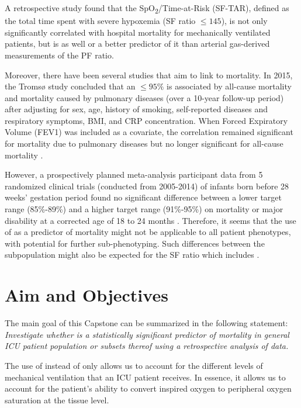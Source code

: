 A retrospective study found that the SpO\textsubscript{2}/\Fi Time-at-Risk (SF-TAR), defined as the total time spent with severe hypoxemia (SF ratio $\leq 145$), is not only significantly correlated with hospital mortality for mechanically ventilated patients, but is as well or a better predictor of it than arterial gas-derived measurements of the PF ratio. 

Moreover, there have been several studies that aim to link \Sp to mortality. In 2015, the Tromsø study concluded that an \Sp $\leq95\%$ is associated by all-cause mortality and mortality caused by pulmonary diseases (over a 10-year follow-up period) after adjusting for sex, age, history of smoking, self-reported diseases and respiratory symptoms, BMI, and CRP concentration. When Forced Expiratory Volume (FEV1) was included as a covariate, the correlation remained significant for mortality due to pulmonary diseases but no longer significant for all-cause mortality \citep{vold2015low}. 

However, a prospectively planned meta-analysis  participant data from 5 randomized clinical trials (conducted from 2005-2014) of infants born before 28 weeks' gestation period found no significant difference between a lower \Sp target range (85\%-89\%) and a higher \Sp target range (91\%-95\%) on mortality or major disability at a corrected age of 18 to 24 months \citep{askie2018association}. Therefore, it seems that the use of \Sp as a predictor of mortality might not be applicable to all patient phenotypes, with potential for further sub-phenotyping. Such differences between the subpopulation might also be expected for the SF ratio which includes \Sp. 


\section{Aim and Objectives} 

The main goal of this Capstone can be summarized in the following statement: \\
\textit{ Investigate whether \SF is a statistically significant predictor of mortality in general ICU patient population or subsets thereof using a retrospective analysis of data.
}

The use of \SF instead of only \Sp allows us to account for the different levels of mechanical ventilation that an ICU patient receives. In essence, it allows us to account for the patient's ability to convert inspired oxygen to peripheral oxygen saturation at the tissue level. 


